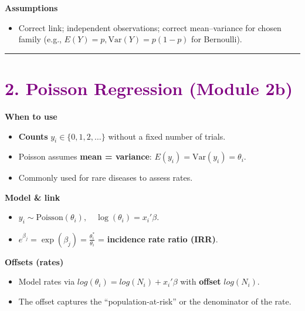 \documentclass[
  letterpaper,
  DIV=11,
  numbers=noendperiod]{scrreprt}
\providecommand{\tightlist}{%
  \setlength{\itemsep}{0pt}\setlength{\parskip}{0pt}}\usepackage{longtable,booktabs,array}
\begin{document}
\textbf{Assumptions}

\begin{itemize}
\tightlist
\item
  Correct link; independent observations; correct mean--variance for
  chosen family (e.g., \(E(Y)=p, \text{Var}(Y)=p(1-p)\) for Bernoulli).
\end{itemize}

\begin{center}\rule{0.5\linewidth}{0.5pt}\end{center}

\hypertarget{section-13}{%
\section*{\texorpdfstring{\textcolor{purple}{2. Poisson Regression (Module 2b)}}{}}\label{section-13}}

\markright{\textcolor{purple}{2. Poisson Regression (Module 2b)}}

\textbf{When to use}

\begin{itemize}
\tightlist
\item
  \textbf{Counts} \(y_i\in\{0,1,2,\dots\}\) without a fixed number of
  trials.
\item
  Poisson assumes \textbf{mean = variance}:
  \(E(y_i)=\text{Var}(y_i)=\theta_i\).
\item
  Commonly used for rare diseases to assess rates.
\end{itemize}

\textbf{Model \& link}

\begin{itemize}
\tightlist
\item
  \(y_i\sim \text{Poisson}(\theta_i),\quad \log(\theta_i)=x_i'\beta\).
\item
  \(e^{\beta_j} = \exp(\beta_j) = \frac{\theta_i^*}{\theta_i}\) =
  \textbf{incidence rate ratio (IRR)}.
\end{itemize}

\textbf{Offsets (rates)}

\begin{itemize}
\tightlist
\item
  Model rates via \(log(\theta_i)=log(N_i) + x_i'\beta\) with
  \textbf{offset} \(log(N_i)\).
\item
  The offset captures the ``population-at-risk'' or the denominator of
  the rate.
\end{itemize}
\end{document}
